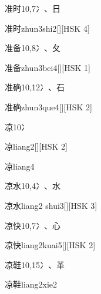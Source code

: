 \begin{entry}{准时}{10,7}{⼎、⽇}
  \begin{phonetics}{准时}{zhun3shi2}[][HSK 4]
  \end{phonetics}
\end{entry}

\begin{entry}{准备}{10,8}{⼎、⼡}
  \begin{phonetics}{准备}{zhun3bei4}[][HSK 1]
  \end{phonetics}
\end{entry}

\begin{entry}{准确}{10,12}{⼎、⽯}
  \begin{phonetics}{准确}{zhun3que4}[][HSK 2]
  \end{phonetics}
\end{entry}

\begin{entry}{凉}{10}{⼎}
  \begin{phonetics}{凉}{liang2}[][HSK 2]
  \end{phonetics}
  \begin{phonetics}{凉}{liang4}
  \end{phonetics}
\end{entry}

\begin{entry}{凉水}{10,4}{⼎、⽔}
  \begin{phonetics}{凉水}{liang2 shui3}[][HSK 3]
  \end{phonetics}
\end{entry}

\begin{entry}{凉快}{10,7}{⼎、⼼}
  \begin{phonetics}{凉快}{liang2kuai5}[][HSK 2]
  \end{phonetics}
\end{entry}

\begin{entry}{凉鞋}{10,15}{⼎、⾰}
  \begin{phonetics}{凉鞋}{liang2xie2}
  \end{phonetics}
\end{entry}

